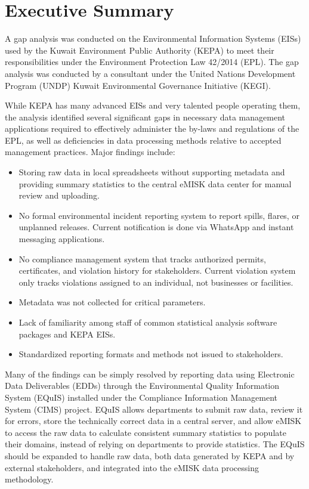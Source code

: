 \chapter*{Executive Summary}

A gap analysis was conducted on the Environmental Information Systems (EISs) used by the Kuwait Environment Public Authority (KEPA) to meet their responsibilities under the Environment Protection Law 42/2014 (EPL). The gap analysis was conducted by a consultant under the United Nations Development Program (UNDP) Kuwait Environmental Governance Initiative (KEGI).

While KEPA has many advanced EISs and very talented people operating them, the analysis identified several significant gaps in necessary data management applications required to effectively administer the by-laws and regulations of the EPL, as well as deficiencies in data processing methods relative to accepted management practices. Major findings include:

\begin{itemize}

\item Storing raw data in local spreadsheets without supporting metadata and providing summary statistics to the central eMISK data center for manual review and uploading.
\item No formal environmental incident reporting system to report spills, flares, or unplanned releases. Current notification is done via WhatsApp and instant messaging applications. 
\item No compliance management system that tracks authorized permits, certificates, and violation history for stakeholders. Current violation system only tracks violations assigned to an individual, not businesses or facilities.
\item Metadata was not collected for critical parameters.
\item Lack of familiarity among staff of common statistical analysis software packages and KEPA EISs. 
\item Standardized reporting formats and methods not issued to stakeholders.
\end{itemize}

Many of the findings can be simply resolved by reporting data using Electronic Data Deliverables (EDDs) through the Environmental Quality Information System (EQuIS) installed under the Compliance Information Management System (CIMS) project. EQuIS allows departments to submit raw data, review it for errors, store the technically correct data in a central server, and allow eMISK to access the raw data to calculate consistent summary statistics to populate their domains, instead of relying on departments to provide statistics. The EQuIS should be expanded to handle raw data, both data generated by KEPA and by external stakeholders, and integrated into the eMISK data processing methodology.

